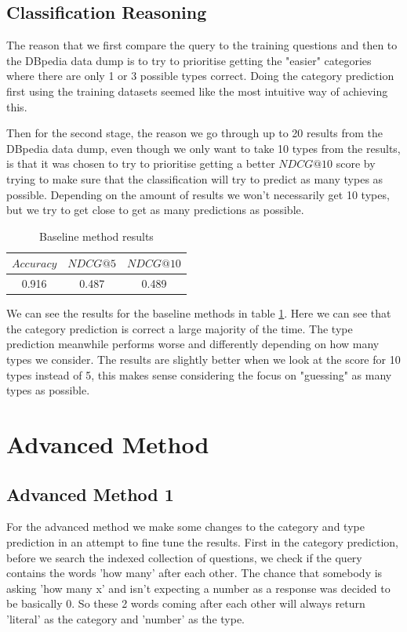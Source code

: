 \documentclass[sigconf]{acmart}
\begin{document}
\subsection{Classification Reasoning}

The reason that we first compare the query to the training questions and then to the DBpedia data dump is to try to prioritise getting the "easier" categories where there are only 1 or 3 possible types correct. Doing the category prediction first using the training datasets seemed like the most intuitive way of achieving this. 

Then for the second stage, the reason we go through up to 20 results from the DBpedia data dump, even though we only want to take 10 types from the results, is that it was chosen to try to prioritise getting a better $NDCG@10$ score by trying to make sure that the classification will try to predict as many types as possible. Depending on the amount of results we won't necessarily get 10 types, but we try to get close to get as many predictions as possible.

\begin{table}[h]
    \centering
    \caption{Baseline method results}
    \begin{tabular}{c|c|c}
    $Accuracy$ & $NDCG@5$ & $NDCG@10$ \\
    \hline
    0.916 & 0.487 & 0.489
    \end{tabular}
    \label{tab:baseline_res}
\end{table}

We can see the results for the baseline methods in table \ref{tab:baseline_res}. Here we can see that the category prediction is correct a large majority of the time. The type prediction meanwhile performs worse and differently depending on how many types we consider. The results are slightly better when we look at the score for 10 types instead of 5, this makes sense considering the focus on "guessing" as many types as possible.

\section{Advanced Method}
\subsection{Advanced Method 1}
For the advanced method we make some changes to the category and type prediction in an attempt to fine tune the results. First in the category prediction, before we search the indexed collection of questions, we check if the query contains the words 'how many' after each other. The chance that somebody is asking 'how many x' and isn't expecting a number as a response was decided to be basically 0. So these 2 words coming after each other will always return 'literal' as the category and 'number' as the type. 
\end{document}
